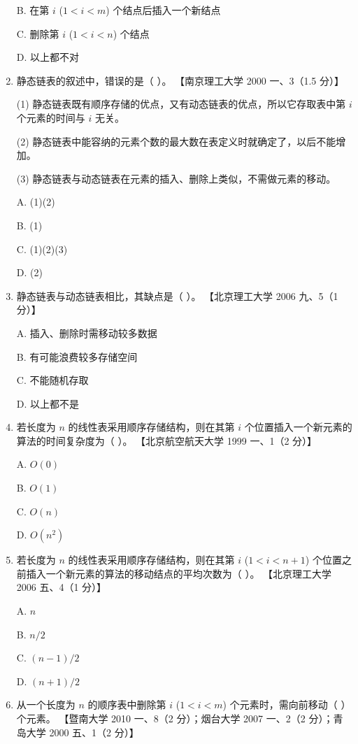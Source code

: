 \documentclass[lang=cn,newtx,10pt,scheme=chinese]{elegantbook}
\begin{document}
\begin{enumerate}
    B. 在第 $i$ ($1 < i < m$) 个结点后插入一个新结点  

    C. 删除第 $i$ ($1 < i < n$) 个结点  

    D. 以上都不对  

    \item 静态链表的叙述中，错误的是（ ）。  
    【南京理工大学 2000 一、3（1.5 分）】  

    (1) 静态链表既有顺序存储的优点，又有动态链表的优点，所以它存取表中第 $i$ 个元素的时间与 $i$ 无关。  

    (2) 静态链表中能容纳的元素个数的最大数在表定义时就确定了，以后不能增加。  

    (3) 静态链表与动态链表在元素的插入、删除上类似，不需做元素的移动。  

    A. (1)(2)  

    B. (1)  

    C. (1)(2)(3)  

    D. (2)  

    \item 静态链表与动态链表相比，其缺点是（ ）。  
    【北京理工大学 2006 九、5（1 分）】  

    A. 插入、删除时需移动较多数据  

    B. 有可能浪费较多存储空间  

    C. 不能随机存取  

    D. 以上都不是  

    \item 若长度为 $n$ 的线性表采用顺序存储结构，则在其第 $i$ 个位置插入一个新元素的算法的时间复杂度为（ ）。  
    【北京航空航天大学 1999 一、1（2 分）】  

    A. $O(0)$  

    B. $O(1)$  

    C. $O(n)$  

    D. $O(n^2)$  

    \item 若长度为 $n$ 的线性表采用顺序存储结构，则在其第 $i$ ($1 < i < n+1$) 个位置之前插入一个新元素的算法的移动结点的平均次数为（ ）。  
    【北京理工大学 2006 五、4（1 分）】  

    A. $n$  

    B. $n/2$  

    C. $(n-1)/2$  

    D. $(n+1)/2$  

    \item 从一个长度为 $n$ 的顺序表中删除第 $i$ ($1 < i < m$) 个元素时，需向前移动（ ）个元素。  
    【暨南大学 2010 一、8（2 分）；烟台大学 2007 一、2（2 分）；青岛大学 2000 五、1（2 分）】  


\end{enumerate}
\end{document}
